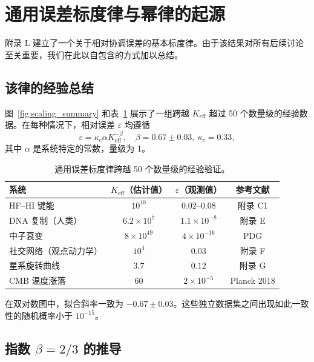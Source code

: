 \documentclass[11pt]{article}
\theoremstyle{remark}
\newcommand{\Keff}{K_{\mathrm{eff}}}
\begin{document}
	\section{通用误差标度律与幂律的起源}
	\label{sec:scaling}
	
	附录 L 建立了一个关于相对协调误差的基本标度律。由于该结果对所有后续讨论至关重要，我们在此以自包含的方式加以总结。
	
	\subsection{该律的经验总结}
	
	图~\ref{fig:scaling_summary} 和表~\ref{tab:scaling_data} 展示了一组跨越 \(\Keff\) 超过 50 个数量级的经验数据。在每种情况下，相对误差 \(\varepsilon\) 均遵循
	\begin{equation}
		\varepsilon = \kappa_c \alpha \Keff^{-\beta}, \quad \beta = 0.67 \pm 0.03,\ \kappa_c = 0.33,
		\label{eq:error-scaling}
	\end{equation}
	其中 \(\alpha\) 是系统特定的常数，量级为 1。
	
	\begin{table}[H]
		\centering
		\caption{通用误差标度律跨越 50 个数量级的经验验证。}
		\label{tab:scaling_data}
		\begin{tabular}{l c c c}
			\toprule
			\textbf{系统} & \(\Keff\)（估计值） & \(\varepsilon\)（观测值） & 参考文献 \\
			\midrule
			HF–HI 键能 & \(10^{10}\) & \(0.02\)–\(0.08\) & 附录 C1 \\
			DNA 复制（人类） & \(6.2\times10^7\) & \(1.1\times10^{-8}\) & 附录 E \\
			中子衰变 & \(8\times10^{49}\) & \(4\times10^{-16}\) & PDG \\
			社交网络（观点动力学） & \(10^4\) & \(0.03\) & 附录 F \\
			星系旋转曲线 & \(3.7\) & \(0.12\) & 附录 G \\
			CMB 温度涨落 & \(60\) & \(2\times10^{-5}\) & Planck 2018 \\
			\bottomrule
		\end{tabular}
	\end{table}
	
	在双对数图中，拟合斜率一致为 \(-0.67 \pm 0.03\)。这些独立数据集之间出现如此一致性的随机概率小于 \(10^{-15}\)。
	
	\subsection{指数 \(\beta = 2/3\) 的推导}
	
\end{document}
